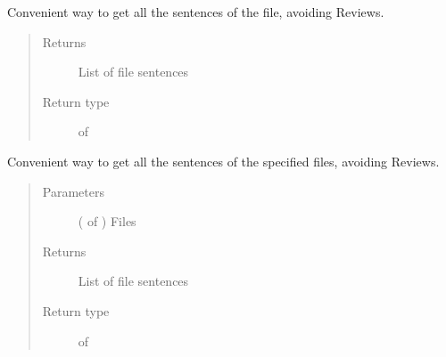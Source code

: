 \documentclass[letterpaper,10pt,english]{sphinxmanual}
\begin{document}
\begin{fulllineitems}
\begin{fulllineitems}
\end{fulllineitems}


\begin{fulllineitems}
\label{\detokenize{classes:loacore.classes.classes.File.sentence_list}}
Convenient way to get all the sentences of the file, avoiding Reviews.
\begin{quote}\begin{description}
\item[{Returns}] \leavevmode
List of file sentences

\item[{Return type}] \leavevmode
{} of {\hyperref[\detokenize{classes:loacore.classes.classes.Sentence}]{}}

\end{description}\end{quote}

\end{fulllineitems}


\begin{fulllineitems}
\label{\detokenize{classes:loacore.classes.classes.File.sentence_list_from_files}}
Convenient way to get all the sentences of the specified files, avoiding Reviews.
\begin{quote}\begin{description}
\item[{Parameters}] \leavevmode
{} ( of {\hyperref[\detokenize{classes:loacore.classes.classes.File}]{}}) \textendash{} Files

\item[{Returns}] \leavevmode
List of file sentences

\item[{Return type}] \leavevmode
{} of {\hyperref[\detokenize{classes:loacore.classes.classes.Sentence}]{}}

\end{description}\end{quote}

\end{fulllineitems}


\end{fulllineitems}
\end{document}
